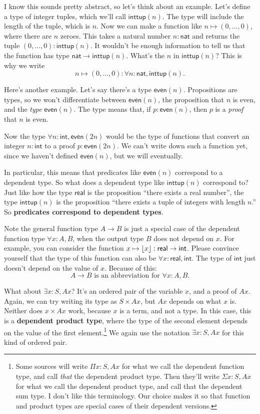 \documentclass[11pt,paper=letter]{scrartcl}
\newcommand{\sf}{\mathsf}
\begin{document}
I know this sounds pretty abstract, so let's think about an example. Let's define a type of integer tuples, which we'll call $\sf{inttup}(n)$. The type will include the length of the tuple, which is $n$. Now we can make a function like $n \mapsto (0, \ldots, 0)$, where there are $n$ zeroes. This takes a natural number $n : \sf{nat}$ and returns the tuple $(0, \ldots, 0) : \sf{inttup}(n)$. It wouldn't be enough information to tell us that the function has type $\sf{nat} \to \sf{inttup}(n)$. What's the $n$ in $\sf{inttup}(n)$? This is why we write \[
  n \mapsto (0, \ldots, 0) : \forall n: \sf{nat}, \sf{inttup}(n).
\]

Here's another example. Let's say there's a type $\sf{even}(n)$. Propositions are types, so we won't differentiate between $\sf{even}(n)$, the proposition that $n$ is even, and the \emph{type} $\sf{even}(n)$. The type means that, if $p : \sf{even}(n)$, then $p$ is a \emph{proof} that $n$ is even.

Now the type $\forall n: \sf{int}, \sf{even}(2n)$ would be the type of functions that convert an integer $n : \sf{int}$ to a proof $p : \sf{even}(2n)$. We can't write down such a function yet, since we haven't defined $\sf{even}(n)$, but we will eventually.

In particular, this means that predicates like $\sf{even}(n)$ correspond to a dependent type. So what does a dependent type like $\sf{inttup}(n)$ correspond to? Just like how the type $\sf{real}$ is the proposition ``there exists a real number'', the type $\sf{inttup}(n)$ is the proposition ``there exists a tuple of integers with length $n$.'' So \textbf{predicates correspond to dependent types}.

Note the general function type $A \to B$ is just a special case of the dependent function type $\forall x: A, B$, when the output type $B$ does not depend on $x$. For example, you can consider the function $x \mapsto \floor{x} : \sf{real} \to \sf{int}$. Please convince yourself that the type of this function can also be $\forall x: \sf{real}, \sf{int}$. The type of $\sf{int}$ just doesn't depend on the value of $x$. Because of this: \[
  A \to B \text{ is an abbreviation for } \forall x: A, B.
\]

What about $\exists x: S, Ax$? It's an ordered pair of the variable $x$, and a proof of $Ax$. Again, we can try writing its type as $S \times Ax$, but $Ax$ depends on what $x$ is. Neither does $x \times Ax$ work, because $x$ is a term, and not a type. In this case, this is a \textbf{dependent product type}, where the type of the second element depends on the value of the first element.\footnote{Some sources will write $\Pi x: S, Ax$ for what we call the dependent function type, and call \emph{that} the dependent product type. Then they'll write $\Sigma x: S, Ax$ for what we call the dependent product type, and call that the dependent sum type. I don't like this terminology. Our choice makes it so that function and product types are special cases of their dependent versions.} We again use the notation $\exists x : S, Ax$ for this kind of ordered pair.
\end{document}
